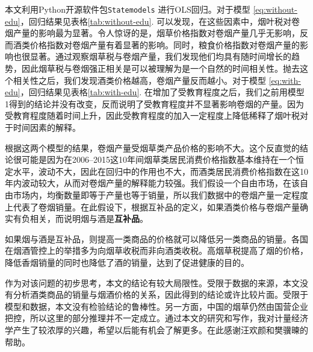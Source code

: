 \documentclass[10pt,a4paper,twocolumn]{PPRAcn} %
\begin{document}
本文利用Python开源软件包\texttt{Statemodels} \cite{statsmodels} 进行OLS回归。对于模型 \eqref{eq:without-edu}，回归结果见表格\ref{tab:without-edu}. 可以发现，在这些因素中，烟叶税对卷烟产量的影响最为显著。令人惊讶的是，烟草价格指数对卷烟产量几乎无影响，反而酒类价格指数对卷烟产量有着显著的影响。同时，粮食价格指数对卷烟产量的影响也很显著。通过观察烟草税与卷烟产量，我们发现他们均具有随时间增长的趋势，因此烟草税与卷烟强正相关是可以被理解为是一个自然的时间相关性。抛去这个相关性之后，我们发现酒类价格越高，卷烟产量反而越小。对于模型 \eqref{eq:with-edu}，回归结果见表格\ref{tab:with-edu}. 在增加了受教育程度之后，我们之前用模型1得到的结论并没有改变，反而说明了受教育程度并不显著影响卷烟的产量。因为受教育程度随着时间上升，因此受教育程度的加入一定程度上降低稀释了烟叶税对于时间因素的解释。

根据这两个模型的结果，卷烟产量受烟草类产品价格的影响不大。这个反直觉的结论很可能是因为在2006--2015这10年间烟草类居民消费价格指数基本维持在一个恒定水平，波动不大，因此在回归中的作用也不大，而酒类居民消费价格指数在这10年内波动较大，从而对卷烟产量的解释能力较强。我们假设一个自由市场，在该自由市场内，均衡数量即等于产量也等于销量，所以我们数据中的卷烟产量一定程度上代表了卷烟销量。在此假设下，根据互补品的定义，如果酒类价格与卷烟产量确实有负相关，而说明烟与酒是\textbf{互补品}。

如果烟与酒是互补品，则提高一类商品的价格就可以降低另一类商品的销量。各国在烟酒管控上的举措多为向烟草收税而非向酒类收税。高烟草税提高了烟的价格，降低香烟销量的同时也降低了酒的销量，达到了促进健康的目的。

\vspace{2em}

作为对该问题的初步思考，本文的结论有较大局限性。受限于数据的来源，本文没有分析酒类商品的销量与烟酒价格的关系，因此得到的结论或许比较片面。受限于模型和数据，本文没有检验结论的鲁棒性。另一方面，中国的烟草仍然由国营企业把控，所以这里的部分推理并不一定成立。通过本文的研究和写作，我对计量经济学产生了较浓厚的兴趣，希望以后能有机会了解更多。在此感谢汪欢颜和樊骥暕的帮助。



\small
\renewcommand\refname{参考文献}



\end{document}
